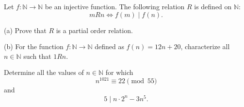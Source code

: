 \documentclass{article}
\begin{document}
	
	Let $f: \mathbb{N} \rightarrow \mathbb{N}$ be an injective function. The following relation $R$ is defined on $\mathbb{N}$:
	\[ mRn \Leftrightarrow f(m) \mid f(n). \]
	
	(a) Prove that $R$ is a partial order relation.
	
	(b) For the function $f: \mathbb{N} \rightarrow \mathbb{N}$ defined as $f(n) = 12n + 20$, characterize all $n \in \mathbb{N}$ such that $1Rn$.
	
	\vspace*{3cm}
	
	Determine all the values of $n \in \mathbb{N}$ for which
	\[ n^{1021} \equiv 22 \pmod{55} \] and
	\[ 5 \mid n \cdot 2^n - 3n^5. \]
	
\end{document}
